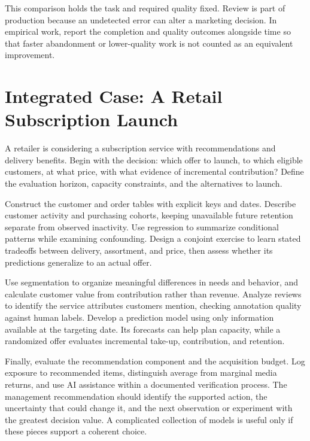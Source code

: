 This comparison holds the task and required quality fixed. Review is
part of production because an undetected error can alter a marketing
decision. In empirical work, report the completion and quality outcomes
alongside time so that faster abandonment or lower-quality work is not
counted as an equivalent improvement.

\hypertarget{M08-integrated-case-a-retail-subscription-launch}{%
\section{Integrated Case: A Retail Subscription
Launch}\label{M08-integrated-case-a-retail-subscription-launch}}

\noindent A retailer is considering a subscription service with recommendations
and delivery benefits. Begin with the decision: which offer to launch,
to which eligible customers, at what price, with what evidence of
incremental contribution? Define the evaluation horizon, capacity
constraints, and the alternatives to launch.

Construct the customer and order tables with explicit keys and dates.
Describe customer activity and purchasing cohorts, keeping unavailable
future retention separate from observed inactivity. Use regression to
summarize conditional patterns while examining confounding. Design a
conjoint exercise to learn stated tradeoffs between delivery,
assortment, and price, then assess whether its predictions generalize to
an actual offer.

Use segmentation to organize meaningful differences in needs and
behavior, and calculate customer value from contribution rather than
revenue. Analyze reviews to identify the service attributes customers
mention, checking annotation quality against human labels. Develop a
prediction model using only information available at the targeting date.
Its forecasts can help plan capacity, while a randomized offer evaluates
incremental take-up, contribution, and retention.

Finally, evaluate the recommendation component and the acquisition
budget. Log exposure to recommended items, distinguish average from
marginal media returns, and use AI assistance within a documented
verification process. The management recommendation should identify the
supported action, the uncertainty that could change it, and the next
observation or experiment with the greatest decision value. A
complicated collection of models is useful only if these pieces support
a coherent choice.

